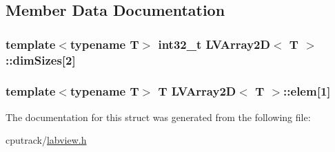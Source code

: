 \subsection{Member Data Documentation}
\subsubsection[{\texorpdfstring{dim\+Sizes}{dimSizes}}]{\setlength{\rightskip}{0pt plus 5cm}template$<$typename T$>$ int32\+\_\+t {\bf L\+V\+Array2D}$<$ T $>$\+::dim\+Sizes\mbox{[}2\mbox{]}}\hypertarget{struct_l_v_array2_d_ae697948bfe264453c305d4838a158cbb}{}\label{struct_l_v_array2_d_ae697948bfe264453c305d4838a158cbb}
\subsubsection[{\texorpdfstring{elem}{elem}}]{\setlength{\rightskip}{0pt plus 5cm}template$<$typename T$>$ T {\bf L\+V\+Array2D}$<$ T $>$\+::elem\mbox{[}1\mbox{]}}\hypertarget{struct_l_v_array2_d_ac8ad3b86f939ed4fc2c5529b727c419f}{}\label{struct_l_v_array2_d_ac8ad3b86f939ed4fc2c5529b727c419f}


The documentation for this struct was generated from the following file\+:\begin{DoxyCompactItemize}
\item 
cputrack/\hyperlink{labview_8h}{labview.\+h}\end{DoxyCompactItemize}
